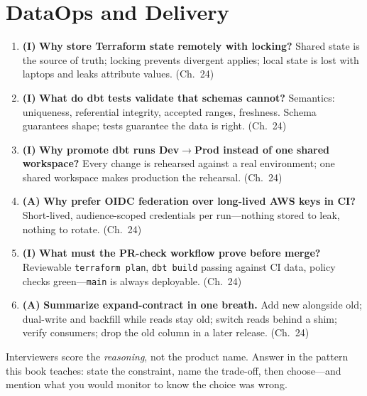 \section{DataOps and Delivery}
\begin{enumerate}
    \item \textbf{(I)} \textbf{Why store Terraform state remotely with locking?}
    Shared state is the source of truth; locking prevents divergent applies; local state is lost
    with laptops and leaks attribute values. (Ch.~24)
    \item \textbf{(I)} \textbf{What do dbt tests validate that schemas cannot?}
    Semantics: uniqueness, referential integrity, accepted ranges, freshness. Schema guarantees
    shape; tests guarantee the data is right. (Ch.~24)
    \item \textbf{(I)} \textbf{Why promote dbt runs Dev$\rightarrow$Prod instead of one shared
    workspace?}
    Every change is rehearsed against a real environment; one shared workspace makes production
    the rehearsal. (Ch.~24)
    \item \textbf{(A)} \textbf{Why prefer OIDC federation over long-lived AWS keys in CI?}
    Short-lived, audience-scoped credentials per run---nothing stored to leak, nothing to rotate.
    (Ch.~24)
    \item \textbf{(I)} \textbf{What must the PR-check workflow prove before merge?}
    Reviewable \texttt{terraform plan}, \texttt{dbt build} passing against CI data, policy checks
    green---\texttt{main} is always deployable. (Ch.~24)
    \item \textbf{(A)} \textbf{Summarize expand-contract in one breath.}
    Add new alongside old; dual-write and backfill while reads stay old; switch reads behind a
    shim; verify consumers; drop the old column in a later release. (Ch.~24)
\end{enumerate}

\begin{tipbox}
Interviewers score the \emph{reasoning}, not the product name. Answer in the pattern this book
teaches: state the constraint, name the trade-off, then choose---and mention what you would
monitor to know the choice was wrong.
\end{tipbox}
